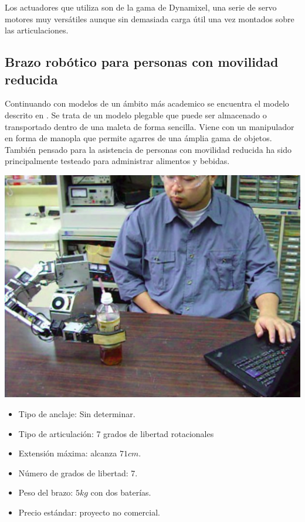      Los actuadores que utiliza son de la gama de Dynamixel, una serie de servo motores muy versátiles aunque sin demasiada carga útil una vez montados sobre las articulaciones.

 \subsection{Brazo robótico para personas con movilidad reducida}

    Continuando con modelos de un ámbito más academico se encuentra el modelo descrito en \cite{Hideyuki:2010}. Se trata de un modelo plegable que puede ser almacenado o transportado dentro de una maleta de forma sencilla. Viene con un manipulador en forma de manopla que permite agarres de una ámplia gama de objetos. También pensado para la asistencia de personas con movilidad reducida ha sido principalmente testeado para administrar alimentos y bebidas.
    \\

     \begin{minipage}{0.35\textwidth}
       \includegraphics[width=\linewidth]{figuras/Imagenes_EstadoArte/Tokyo.png}
     \end{minipage}
     \begin{minipage}{0.65\textwidth}\raggedright
       \hspace{1cm}
       \begin{itemize}
           \item Tipo de anclaje: Sin determinar.
           \item Tipo de articulación: 7 grados de libertad rotacionales
   	  		\item Extensión máxima: alcanza $71cm$.
   	  		\item Número de grados de libertad: 7.
   	  		\item Peso del brazo: $5kg$ con dos baterías.
   	  		\item Precio estándar: proyecto no comercial.
       \end{itemize}
     \end{minipage}
     \\

